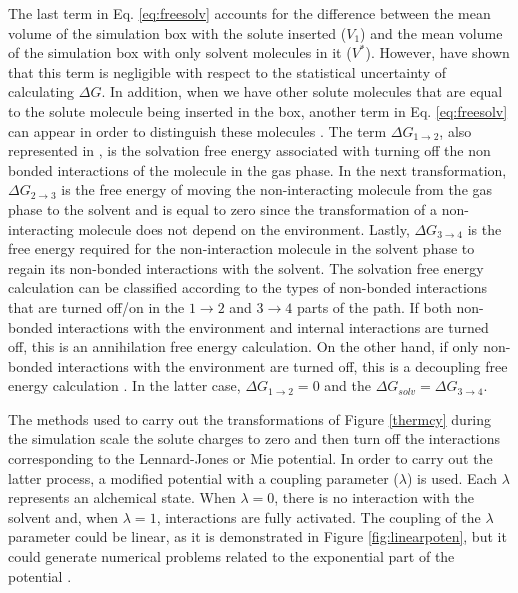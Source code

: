 The last term in Eq. \ref{eq:freesolv} accounts for the difference between the mean volume of the simulation box with the solute inserted ($V_{1}$) and the mean volume of the simulation box with only solvent molecules in it ($V^{*}$). However,  have shown that this term is negligible with respect to the statistical uncertainty of calculating $\Delta G$. In addition, when we have other solute molecules that are equal to the solute molecule being inserted in the box, another term in Eq. \ref{eq:freesolv} can appear in order to distinguish these molecules \cite{shirts2013}. The  term $\Delta G_{1 \rightarrow 2}$, also represented in ,  is the solvation free energy associated with turning off the non bonded interactions of the molecule in the gas phase. In the next transformation, $\Delta G_{2 \rightarrow 3}$ is the free energy of moving the non-interacting molecule from the gas phase to the solvent and is equal to zero since the transformation of a non-interacting molecule does not depend on the environment. Lastly, $\Delta G_{3 \rightarrow 4}$ is the free energy required for the non-interaction molecule in the solvent phase to regain its non-bonded interactions with the solvent.  The solvation free energy calculation can be classified according to the types of non-bonded interactions that are turned off/on in the $1 \rightarrow 2$ and $ 3 \rightarrow 4$ parts of the path. If both non-bonded interactions with the environment and internal interactions are turned off, this is an annihilation free energy calculation. On the other hand, if only non-bonded interactions with the environment are turned off, this is a decoupling free energy calculation \cite{klimovich}. In the latter case, $\Delta G_{1 \rightarrow 2} = 0$ and the $\Delta G_{solv} = \Delta G_{3 \rightarrow 4} $.  

The methods used to carry out the transformations of Figure \ref{thermcy} during the simulation scale the solute charges to zero and then turn off the interactions corresponding to the Lennard-Jones or Mie potential. In order to carry out the latter process, a modified potential with a coupling parameter ($\lambda$) is used. Each $\lambda$ represents an alchemical state. When $\lambda=0$, there is no interaction with the solvent and, when $\lambda=1$, interactions are fully activated. The coupling of the $\lambda$ parameter could be linear, as it is demonstrated in Figure \ref{fig:linearpoten}, but it could generate numerical problems related to the exponential part of the potential \cite{shirts2013}. 

